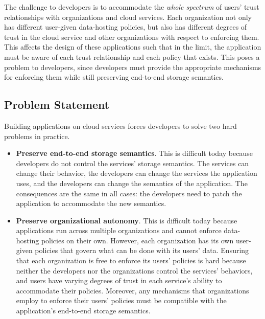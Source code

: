 The challenge to developers is to accommodate the \emph{whole spectrum} of
users' trust relationships with organizations and cloud services.
Each organization not only has different user-given data-hosting
policies, but also has different degrees of trust in the cloud service and other
organizations with respect to enforcing them.
This affects the design of these applications such that in the limit,
the application must be aware of each trust relationship and each policy that
exists.  This poses a problem to developers, since developers 
must provide the appropriate mechanisms for enforcing them while still
preserving end-to-end storage semantics.

\subsection{Problem Statement}

Building applications on cloud services forces developers to solve two hard
problems in practice.

\begin{itemize}
   \item \textbf{Preserve end-to-end storage semantics}.  This is difficult
      today because developers do not
      control the services' storage semantics.  The services can change their
      behavior, the developers can change the services the application uses, and
      the developers can change the semantics of the application.
      The consequences are the same in all cases:  the developers need to patch the application to
      accommodate the new semantics.

   \item \textbf{Preserve organizational autonomy}.  This is difficult today
      because applications run across multiple organizations and cannot enforce
      data-hosting policies on their own.  However, each organization has its
      own user-given policies that govern what can be done with its users' data.
      Ensuring that each organization is free to enforce its users' policies is
      hard because neither the developers nor the organizations
      control the services' behaviors, and users have varying degrees of trust in
      each service's ability to accommodate their policies.  Moreover, any mechanisms
      that organizations employ to enforce their users' policies must be
      compatible with the application's end-to-end storage semantics.
\end{itemize}

